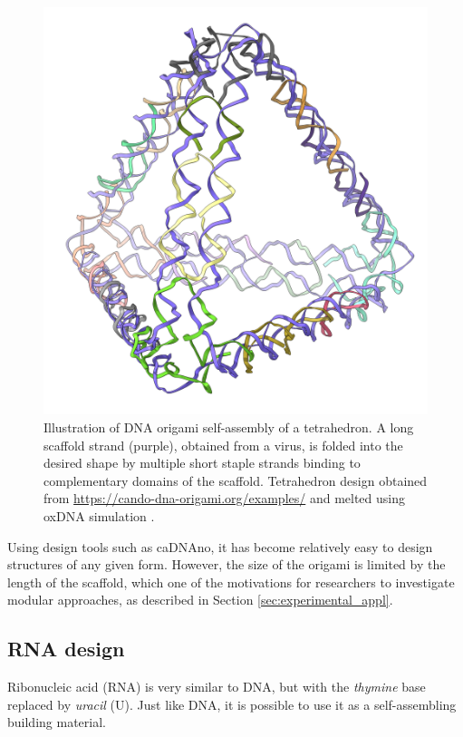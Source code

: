 \begin{figure}
    \centering\includegraphics[width=\textwidth/3]{figures/melt/assembled.png}
    \caption{Illustration of DNA origami self-assembly of a tetrahedron. A long scaffold strand (purple), obtained from a virus, is folded into the desired shape by multiple short staple strands binding to complementary domains of the scaffold. Tetrahedron design obtained from \url{https://cando-dna-origami.org/examples/} and melted using oxDNA simulation \cite{ouldridge2010dna}.
    }
    \label{fig:dnaOrigami}
\end{figure}

Using design tools such as caDNAno\cite{douglas2009rapid}, it has become relatively easy to design structures of any given form. However, the size of the origami is limited by the length of the scaffold, which one of the motivations for researchers to investigate modular approaches, as described in Section \ref{sec:experimental_appl}.

\subsection{RNA design}
\label{sec:RNA_design}
Ribonucleic acid (RNA) is very similar to DNA, but with the \emph{thymine} base replaced by \emph{uracil} (U). Just like DNA, it is possible to use it as a self-assembling building material.

